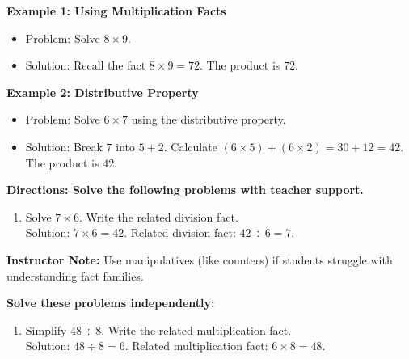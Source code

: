 \documentclass[12pt]{article}
\begin{document}
\begin{tcolorbox}[colframe=black!60, colback=white, 
coltitle=black, colbacktitle=black!15, fonttitle=\bfseries\Large, 
title=Examples, halign title=center, left=10pt, right=10pt, top=10pt, bottom=15pt]
\textbf{Example 1: Using Multiplication Facts}
\begin{itemize}
    \item Problem: Solve \(8 \times 9\).
    \item {\color{red}Solution: Recall the fact \(8 \times 9 = 72\). The product is \(72\).}
\end{itemize}

\textbf{Example 2: Distributive Property}
\begin{itemize}
    \item Problem: Solve \(6 \times 7\) using the distributive property.
    \item {\color{red}Solution: Break \(7\) into \(5 + 2\). Calculate \((6 \times 5) + (6 \times 2) = 30 + 12 = 42\). The product is \(42\).}
\end{itemize}
\end{tcolorbox}

\vspace{2em}

\begin{tcolorbox}[colframe=black!60, colback=white, 
coltitle=black, colbacktitle=black!15, fonttitle=\bfseries\Large, 
title=Guided Practice, halign title=center, left=10pt, right=10pt, top=10pt, bottom=15pt]
\textbf{Directions: Solve the following problems with teacher support.}

\begin{enumerate}[itemsep=5em]
    \item Solve \(7 \times 6\). Write the related division fact.\\
    {\color{red}Solution: \(7 \times 6 = 42\). Related division fact: \(42 \div 6 = 7\).}
\end{enumerate}
{\color{blue}\textbf{Instructor Note:} Use manipulatives (like counters) if students struggle with understanding fact families.}
\end{tcolorbox}

\vspace{2em}

\begin{tcolorbox}[colframe=black!60, colback=white, 
coltitle=black, colbacktitle=black!15, fonttitle=\bfseries\Large, 
title=Independent Practice, halign title=center, left=10pt, right=10pt, top=10pt, bottom=15pt]
\textbf{Solve these problems independently:}
\begin{enumerate}[itemsep=5em]
    \item Simplify \(48 \div 8\). Write the related multiplication fact.\\
    {\color{red}Solution: \(48 \div 8 = 6\). Related multiplication fact: \(6 \times 8 = 48\).}
\end{enumerate}
\end{tcolorbox}
\end{document}

